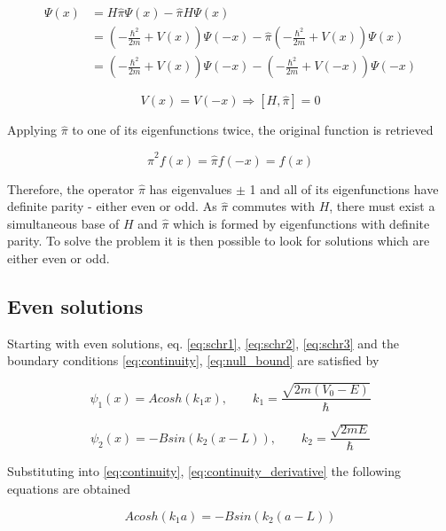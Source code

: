 \documentclass{article}
\begin{document}
\begin{align*}
[H, \hat{\pi}] \Psi(x) & = H \hat{\pi} \Psi(x) - \hat{\pi} H \Psi(x) \\ 
  & = \left(-\frac{\hbar^2}{2m} + V(x)\right)\Psi(-x) -  \hat{\pi} \left(-\frac{\hbar^2}{2m} + V(x)\right)\Psi(x) \\ & = \left(-\frac{\hbar^2}{2m} + V(x)\right)\Psi(-x) -  \left(-\frac{\hbar^2}{2m} + V(-x)\right)\Psi(-x)
\end{align*}

\begin{equation}
\label{eq:parity_commutation}
V(x) = V(-x) \Rightarrow \left[H,\hat{\pi} \right] = 0
\end{equation}

Applying \(\hat{\pi}\) to one of its eigenfunctions twice, the original function is retrieved

\begin{equation}
\hat{\pi}^2f(x) = \hat{\pi}f(-x) = f(x)
\end{equation}

Therefore, the operator \(\hat{\pi}\) has eigenvalues \(\pm\) 1 and all of its eigenfunctions have definite parity - either even or odd. As \(\hat{\pi}\) commutes with \(H\), there must exist a simultaneous base of \(H\) and \(\hat{\pi}\) which is formed by eigenfunctions with definite parity. To solve the problem it is then possible to look for solutions which are either even or odd.

\subsection{Even solutions}
Starting with even solutions, eq. \eqref{eq:schr1}, \eqref{eq:schr2}, \eqref{eq:schr3} and the boundary conditions \eqref{eq:continuity}, \eqref{eq:null_bound} are satisfied by

\begin{equation}
\psi_{1}(x) = A cosh(k_{1} x), \qquad k_{1} = \frac{\sqrt{2m(V_{0} - E)}}{\hbar}
\end{equation}

\begin{equation}
\psi_{2}(x) = - B sin(k_{2}(x-L)), \qquad k_{2} = \frac{\sqrt{2mE}}{\hbar}
\end{equation}

Substituting into \eqref{eq:continuity}, \eqref{eq:continuity_derivative} the following equations are obtained

\begin{equation}
\label{eq:cont_even}
A cosh(k_{1}a) =  - B sin(k_{2}(a-L))
\end{equation}
\end{document}
